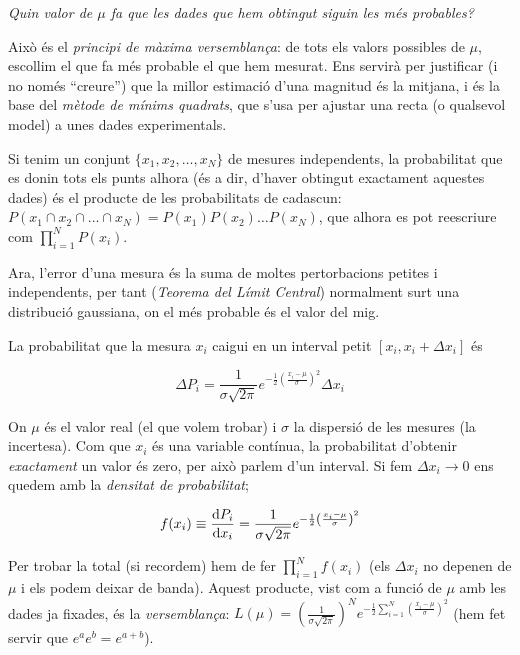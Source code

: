\documentclass[12pt]{article}
\begin{document}
\begin{center}
\textit{Quin valor de $\mu$ fa que les dades que hem obtingut siguin les més probables?}
\end{center}

Això és el \textit{principi de màxima versemblança}: de tots els valors possibles de $\mu$, escollim el que fa més probable el que hem mesurat. Ens servirà per justificar (i no només ``creure'') que la millor estimació d'una magnitud és la mitjana, i és la base del \textit{mètode de mínims quadrats}, que s'usa per ajustar una recta (o qualsevol model) a unes dades experimentals.

Si tenim un conjunt $\{x_1, x_2, \dots, x_N\}$ de mesures independents, la probabilitat que es donin tots els punts alhora (és a dir, d'haver obtingut exactament aquestes dades) és el producte de les probabilitats de cadascun: $P(x_1 \cap x_2 \cap \dots \cap x_N) = P(x_1) P(x_2)\dots P(x_N)$, que alhora es pot reescriure com $\prod_{i=1}^{N} P(x_i)$.

Ara, l'error d'una mesura és la suma de moltes pertorbacions petites i independents, per tant (\textit{Teorema del Límit Central}) normalment surt una distribució gaussiana, on el més probable és el valor del mig.


La probabilitat que la mesura $x_i$ caigui en un interval petit $[x_i, x_i + \Delta x_i]$ és

\[\Delta P_i = \frac{1}{\sigma \sqrt{2\pi}} e^{-\frac{1}{2}\left(\frac{x_i - \mu}{\sigma}\right)^2}\Delta x_i\]

On $\mu$ és el valor real (el que volem trobar) i $\sigma$ la dispersió de les mesures (la incertesa). Com que $x_i$ és una variable contínua, la probabilitat d'obtenir \textit{exactament} un valor és zero, per això parlem d'un interval. Si fem $\Delta x_i \to 0$ ens quedem amb la \textit{densitat de probabilitat};

\[f(x_i) \equiv \dv{P_i}{x_i} = \frac{1}{\sigma\sqrt{2\pi}}e^{-\frac{1}{2}\left(\frac{x_i - \mu}{\sigma}\right)^2}\]

Per trobar la total (si recordem) hem de fer $\prod_{i=1}^{N} f(x_i)$ (els $\Delta x_i$ no depenen de $\mu$ i els podem deixar de banda). Aquest producte, vist com a funció de $\mu$ amb les dades ja fixades, és la \textit{versemblança}: $L(\mu) = \left(\frac{1}{\sigma\sqrt{2\pi}}\right)^N e^{-\frac{1}{2}\sum_{i=1}^{N} \left(\frac{x_i-\mu}{\sigma}\right)^2}$ (hem fet servir que $e^a e^b = e^{a+b}$).
\end{document}
